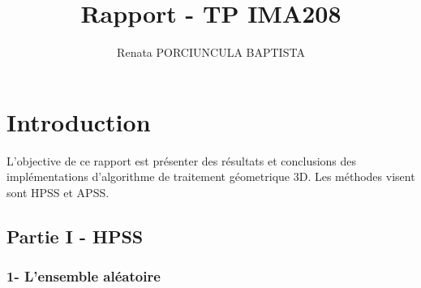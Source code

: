 \documentclass[a4,12pt]{report}
\title{ Rapport - TP IMA208}
\author{Renata PORCIUNCULA BAPTISTA}
\begin{document}
\maketitle

\chapter*{Introduction}
L'objective de ce rapport est présenter des résultats et conclusions des implémentations d'algorithme de traitement géometrique 3D. Les méthodes visent sont HPSS et APSS.
\section*{Partie I - HPSS}
\subsection*{1- L'ensemble aléatoire}
\end{document}
